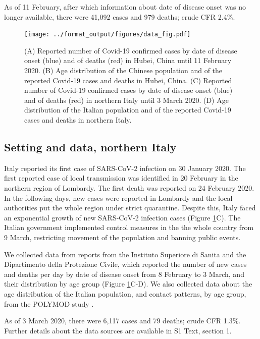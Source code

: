 \documentclass{article}
\begin{document}
As of 11 February, after which information about date of disease onset was no longer available, there were 41,092 cases and 979 deaths; crude CFR 2.4\%. 


\begin{figure}[t]
	\texttt{[image: ../format\_output/figures/data\_fig.pdf]}
	\caption{(A) Reported number of Covid-19 confirmed cases by date of disease onset (blue) and of deaths (red) in Hubei, China until 11 February 2020. (B) Age distribution of the Chinese population and of the reported Covid-19 cases and deaths in Hubei, China. (C) Reported number of Covid-19 confirmed cases by date of disease onset (blue) and of deaths (red) in northern Italy until 3 March 2020. (D) Age distribution of the Italian population and of the reported Covid-19 cases and deaths in northern Italy.}
	\label{fig:desc}
\end{figure}


\subsection*{Setting and data, northern Italy}

Italy reported its first case of SARS-CoV-2 infection on 30 January 2020. 
The first reported case of local transmission was identified in 20 February in the northern region of Lombardy. 
The first death was reported on 24 February 2020.
In the following days, new cases were reported in Lombardy and the local authorities put the whole region under strict quarantine. 
Despite this, Italy faced an exponential growth of new SARS-CoV-2 infection cases (Figure \ref{fig:desc}C). 
The Italian government implemented control measures in the the whole country from 9 March, restricting movement of the population and banning public events. 

We collected data from reports from the Instituto Superiore di Sanita and the Dipartimento della Protezione Civile, which reported the number of new cases and deaths per day by date of disease onset from 8 February to 3 March, and their distribution by age group \cite{Civile,IstitutoSuperiorediSanita} (Figure \ref{fig:desc}C-D). 
We also collected data about the age distribution of the Italian population, and contact patterns, by age group, from the POLYMOD study \cite{mossong2008social}.

As of 3 March 2020, there were 6,117 cases and 79 deaths; crude CFR 1.3\%.
Further details about the data sources are available in S1 Text, section 1. 
\end{document}
